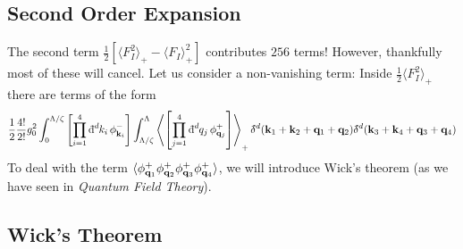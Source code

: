 \subsection*{Second Order Expansion}%

The second term $\frac{1}{2} [\langle F_I^2 \rangle_+ - \langle F_I \rangle_+^2]$ contributes $256$ terms! However, thankfully most of these will cancel.
Let us consider a non-vanishing term: Inside $\frac{1}{2} \langle F_I^2 \rangle_+$ there are terms of the form
\begin{equation}
  \label{eq:11-order-2}
  \frac{1}{2} \frac{4!}{2!} g_0^2 \int_0^{\Lambda/\zeta} \left[ \prod_{i=1}^4 \bdd[d]{k_i} \phi_{\vb{k}_i}^- \right] 
  \int _{\Lambda/\zeta}^\Lambda \left\langle \left[ \prod_{j=1}^4 \bdd[d]{q_j} \phi^+_{\vb{q}_j} \right] \right\rangle_+ 
  \bdelta^d (\vb{k}_1 + \vb{k}_2 + \vb{q}_1 + \vb{q}_2) \bdelta^d(\vb{k}_3 + \vb{k}_4 + \vb{q}_3 + \vb{q}_4)
\end{equation}
To deal with the term $\langle \phi^+_{\vb{q}_1} \phi^+_{\vb{q}_2} \phi^+_{\vb{q}_3} \phi^+_{\vb{q}_4} \rangle$, we will introduce Wick's theorem (as we have seen in \emph{Quantum Field Theory}).

\subsection{Wick's Theorem}%
\label{sub:wick_s_theorem}

